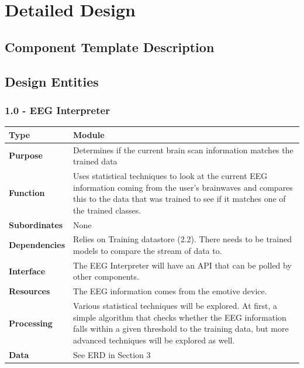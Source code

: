 \documentclass{article}
\begin{document}
\newpage

\section{Detailed Design}

\subsection{Component Template Description}

\subsection{Design Entities}

\subsubsection*{1.0 - EEG Interpreter}
\begin{tabular}{ | l |  p{13.3cm} |}
\hline
\textbf{Type} & Module \\ \hline
\textbf{Purpose} & Determines if the current brain scan information matches the trained data \\ \hline
\textbf{Function} & Uses statistical techniques to look at the current EEG information coming from the user's brainwaves and compares this to the data that was trained to see if it matches one of the trained classes. \\ \hline
\textbf{Subordinates} & None \\ \hline
\textbf{Dependencies} & Relies on Training datastore (2.2). There needs to be trained models to compare the stream of data to. \\ \hline
\textbf{Interface} & The EEG Interpreter will have an API that can be polled by other components. \\ \hline
\textbf{Resources} & The EEG information comes from the emotive device. \\ \hline
\textbf{Processing} & Various statistical techniques will be explored. At first, a simple algorithm that checks whether the EEG information falls within a given threshold to the training data, but more advanced techniques will be explored as well. \\ \hline
\textbf{Data} & See ERD in Section 3 \\ \hline
\end{tabular}
\end{document}

